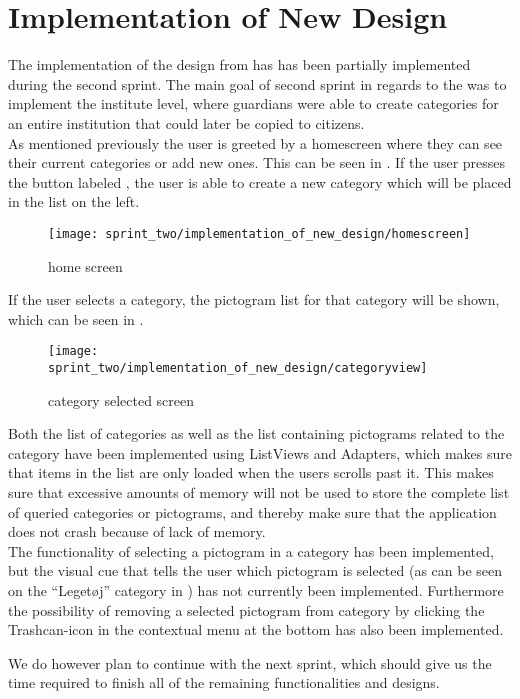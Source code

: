 \section{Implementation of New Design}
\label{sec:implementation_of_new_design}

The implementation of the design from  has has been partially implemented during the second sprint. The main goal of second sprint in regards to the \ct was to implement the institute level, where guardians were able to create categories for an entire institution that could later be copied to citizens.\\

As mentioned previously the user is greeted by a homescreen where they can see their current categories or add new ones. This can be seen in . If the user presses the button labeled , the user is able to create a new category which will be placed in the list on the left. 

\begin{figure}[!htbp]
    \centering
    \texttt{[image: sprint\_two/implementation\_of\_new\_design/homescreen]}
    \caption{\ct home screen}
    \label{fig:ct_home_screen}
\end{figure}

If the user selects a category, the pictogram list for that category will be shown, which can be seen in .\\

\begin{figure}[!htbp]
    \centering
    \texttt{[image: sprint\_two/implementation\_of\_new\_design/categoryview]}
    \caption{\ct category selected screen}
    \label{fig:ct_category_view}
\end{figure}


Both the list of categories as well as the list containing pictograms related to the category have been implemented using ListViews and Adapters, which makes sure that items in the list are only loaded when the users scrolls past it. This makes sure that excessive amounts of memory will not be used to store the complete list of queried categories or pictograms, and thereby make sure that the application does not crash because of lack of memory. \\

The functionality of selecting a pictogram in a category has been implemented, but the visual cue that tells the user which pictogram is selected (as can be seen on the ``Leget\o j'' category in ) has not currently been implemented. Furthermore the possibility of removing a selected pictogram from category by clicking the Trashcan-icon in the contextual menu at the bottom has also been implemented. 

We do however plan to continue with the \ct next sprint, which should give us the time required to finish all of the remaining functionalities and designs.  
